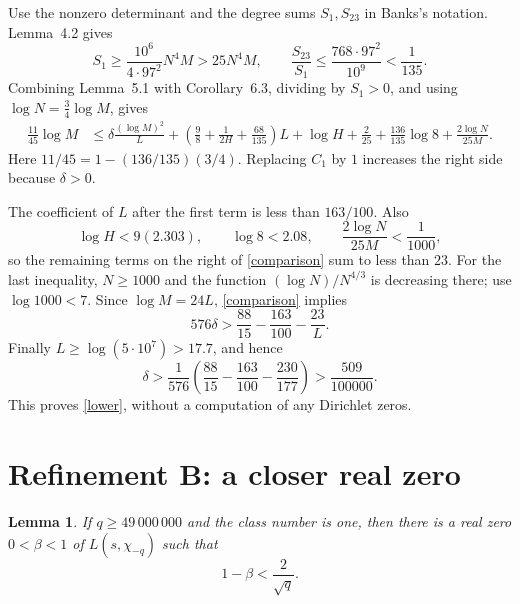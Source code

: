 \documentclass[11pt]{article}
\newtheorem{lemma}[theorem]{Lemma}
\begin{document}
Use the nonzero determinant and the degree sums \(S_1,S_{23}\) in
Banks's notation. Lemma~4.2 gives
\[
 S_1\ge \frac{10^6}{4\cdot97^2}N^4M>25N^4M,\qquad
 \frac{S_{23}}{S_1}\le\frac{768\cdot97^2}{10^9}<\frac1{135}.
\]
Combining Lemma~5.1 with Corollary~6.3, dividing by \(S_1>0\),
and using \(\log N=\tfrac34\log M\), gives
\begin{align}
 \frac{11}{45}\log M
 &\le
 \delta\frac{(\log M)^2}{L}
 +\left(\frac98+\frac1{2H}+\frac{68}{135}\right)L
 +\log H+\frac2{25}+\frac{136}{135}\log8
 +\frac{2\log N}{25M}.
 \label{comparison}
\end{align}
Here \(11/45=1-(136/135)(3/4)\). Replacing \(C_1\) by \(1\)
increases the right side because \(\delta>0\).

The coefficient of \(L\) after the first term is less than \(163/100\).
Also
\[
 \log H<9(2.303),\qquad \log8<2.08,\qquad
 \frac{2\log N}{25M}<\frac1{1000},
\]
so the remaining terms on the right of \eqref{comparison} sum to
less than \(23\). For the last inequality, \(N\ge1000\) and the function
\((\log N)/N^{4/3}\) is decreasing there; use \(\log1000<7\).
Since \(\log M=24L\), \eqref{comparison} implies
\[
 576\delta>\frac{88}{15}-\frac{163}{100}-\frac{23}{L}.
\]
Finally \(L\ge\log(5\cdot10^7)>17.7\), and hence
\begin{equation}\label{rationaldelta}
 \delta>
 \frac{1}{576}\left(\frac{88}{15}-\frac{163}{100}
                         -\frac{230}{177}\right)
 >\frac{509}{100000}.
\end{equation}
This proves \eqref{lower}, without a computation of any Dirichlet zeros.

\section{Refinement B: a closer real zero}\label{sec-refined-theta}

\begin{lemma}\label{theta}
If \(q\ge49\,000\,000\) and the class number is one, then there is
a real zero \(0<\beta<1\) of \(L(s,\chi_{-q})\) such that
\[
                         1-\beta<\frac2{\sqrt q}.
\]
\end{lemma}
\end{document}
